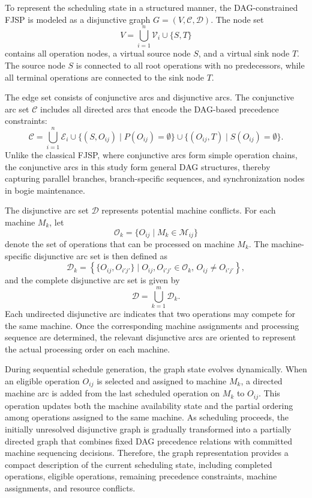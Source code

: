 To represent the scheduling state in a structured manner, the DAG-constrained FJSP is modeled as a disjunctive graph $G=(V,\mathcal{C},\mathcal{D})$. The node set
\begin{equation}
	V=\bigcup_{i=1}^{n}\mathcal{V}_i\cup\{S,T\}
\end{equation}
contains all operation nodes, a virtual source node $S$, and a virtual sink node $T$. The source node $S$ is connected to all root operations with no predecessors, while all terminal operations are connected to the sink node $T$.

The edge set consists of conjunctive arcs and disjunctive arcs. The conjunctive arc set $\mathcal{C}$ includes all directed arcs that encode the DAG-based precedence constraints:
\begin{equation}
	\mathcal{C}=
	\bigcup_{i=1}^{n}\mathcal{E}_i
	\cup
	\{(S,O_{ij})\mid P(O_{ij})=\emptyset\}
	\cup
	\{(O_{ij},T)\mid S(O_{ij})=\emptyset\}.
\end{equation}
Unlike the classical FJSP, where conjunctive arcs form simple operation chains, the conjunctive arcs in this study form general DAG structures, thereby capturing parallel branches, branch-specific sequences, and synchronization nodes in bogie maintenance.

The disjunctive arc set $\mathcal{D}$ represents potential machine conflicts. For each machine $M_k$, let
\begin{equation}
	\mathcal{O}_k=\{O_{ij}\mid M_k\in\mathcal{M}_{ij}\}
\end{equation}
denote the set of operations that can be processed on machine $M_k$. The machine-specific disjunctive arc set is then defined as
\begin{equation}
	\mathcal{D}_k=
	\left\{
	\{O_{ij},O_{i'j'}\}
	\mid
	O_{ij},O_{i'j'}\in\mathcal{O}_k,\,
	O_{ij}\neq O_{i'j'}
	\right\},
\end{equation}
and the complete disjunctive arc set is given by
\begin{equation}
	\mathcal{D}=\bigcup_{k=1}^{m}\mathcal{D}_k.
\end{equation}
Each undirected disjunctive arc indicates that two operations may compete for the same machine. Once the corresponding machine assignments and processing sequence are determined, the relevant disjunctive arcs are oriented to represent the actual processing order on each machine.

During sequential schedule generation, the graph state evolves dynamically. When an eligible operation $O_{ij}$ is selected and assigned to machine $M_k$, a directed machine arc is added from the last scheduled operation on $M_k$ to $O_{ij}$. This operation updates both the machine availability state and the partial ordering among operations assigned to the same machine. As scheduling proceeds, the initially unresolved disjunctive graph is gradually transformed into a partially directed graph that combines fixed DAG precedence relations with committed machine sequencing decisions. Therefore, the graph representation provides a compact description of the current scheduling state, including completed operations, eligible operations, remaining precedence constraints, machine assignments, and resource conflicts.